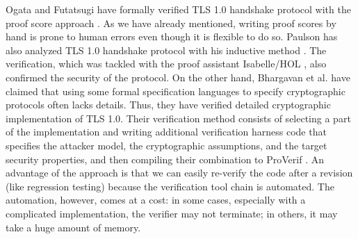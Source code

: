 \documentclass[a4paper,fleqn]{cas-dc}
\begin{document}
Ogata and Futatsugi \cite{1437139} have formally verified TLS 1.0 handshake protocol  with the proof score approach \cite{OgataF03fmoods}.
As we have already mentioned, writing proof scores by hand is prone to human errors even though it is flexible to do so.
Paulson \cite{Paulson99} has also analyzed TLS 1.0 handshake protocol  with his inductive method \cite{Paulson98}.
The verification, which was tackled with the proof assistant Isabelle/HOL \cite{NipkowPW02}, also confirmed the security of the protocol.
On the other hand,
Bhargavan et al. \cite{BhargavanFCZ12} have claimed that using some formal specification languages to specify cryptographic protocols often lacks details.
Thus, they have verified detailed cryptographic implementation of TLS 1.0.
Their verification method consists of selecting a part of the implementation and writing additional verification harness code that specifies the attacker model, the cryptographic
assumptions, and the target security properties, and then compiling their combination to ProVerif \cite{proverif}. 
An advantage of the approach is that we can easily re-verify the code after a revision (like regression testing) because the verification tool chain is automated.
The automation, however, comes at a cost: in some cases, especially with a complicated implementation,
the verifier may not terminate; in others, it may take a huge amount of memory.


\end{document}
